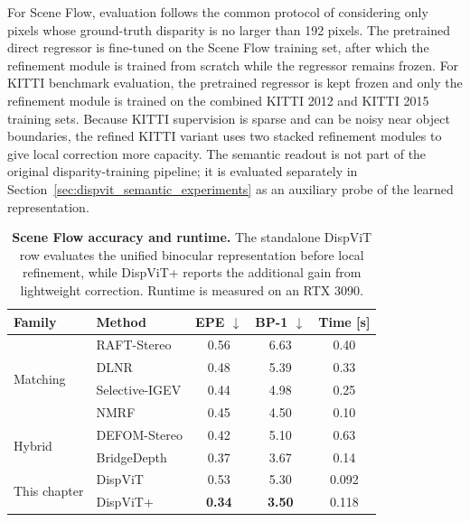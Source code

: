For Scene Flow, evaluation follows the common protocol of considering only pixels whose ground-truth disparity is no larger than 192 pixels.
The pretrained direct regressor is fine-tuned on the Scene Flow training set, after which the refinement module is trained from scratch while the regressor remains frozen.
For KITTI benchmark evaluation, the pretrained regressor is kept frozen and only the refinement module is trained on the combined KITTI 2012 and KITTI 2015 training sets.
Because KITTI supervision is sparse and can be noisy near object boundaries, the refined KITTI variant uses two stacked refinement modules to give local correction more capacity.
The semantic readout is not part of the original disparity-training pipeline; it is evaluated separately in Section~\ref{sec:dispvit_semantic_experiments} as an auxiliary probe of the learned representation.

\begin{table}[!t]
    \centering
    \caption{\textbf{Scene Flow accuracy and runtime.}
    The standalone DispViT row evaluates the unified binocular representation before local refinement, while DispViT+ reports the additional gain from lightweight correction.
    Runtime is measured on an RTX 3090.}
    \label{tab:dispvit_sf_accuracy}
    \small
    \setlength{\tabcolsep}{6pt}
    \renewcommand{\arraystretch}{1.08}
    \vspace{-4pt}
    \begin{tabular*}{\textwidth}{@{\extracolsep{\fill}}llccc@{}}
        \toprule
        \textbf{Family} & \textbf{Method} & EPE $\downarrow$ & BP-1 $\downarrow$ & Time [s] \\
        \midrule
        \multirow{4}{*}{Matching} & RAFT-Stereo & 0.56 & 6.63 & 0.40 \\
        & DLNR & 0.48 & 5.39 & 0.33 \\
        & Selective-IGEV & 0.44 & 4.98 & 0.25 \\
        & NMRF & 0.45 & 4.50 & 0.10 \\
        \midrule
        \multirow{2}{*}{Hybrid} & DEFOM-Stereo & 0.42 & 5.10 & 0.63 \\
        & BridgeDepth & 0.37 & 3.67 & 0.14 \\
        \midrule
        \multirow{2}{*}{This chapter} & DispViT & 0.53 & 5.30 & 0.092 \\
        & DispViT+ & \textbf{0.34} & \textbf{3.50} & 0.118 \\
        \bottomrule
    \end{tabular*}
    \vspace{-4pt}
\end{table}

